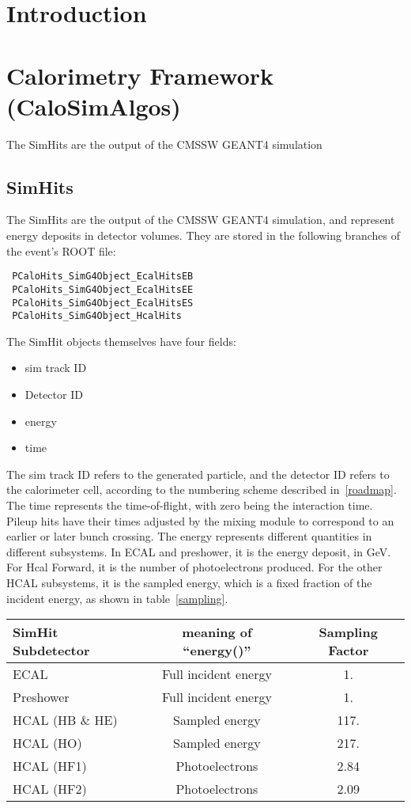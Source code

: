 \documentclass{cmspaper}
\begin{document}
\section{Introduction}


\section{Calorimetry Framework (CaloSimAlgos)}

The SimHits are the output of the CMSSW GEANT4 simulation
\subsection{SimHits}

The SimHits are the output of the CMSSW GEANT4 simulation, and represent energy deposits in
detector volumes.  They are stored in the following branches of the event's ROOT file:

\begin{verbatim}
 PCaloHits_SimG4Object_EcalHitsEB
 PCaloHits_SimG4Object_EcalHitsEE
 PCaloHits_SimG4Object_EcalHitsES
 PCaloHits_SimG4Object_HcalHits
\end{verbatim}

The SimHit objects themselves have four fields:
\begin{itemize}
\item sim track ID
\item Detector ID
\item energy
\item time
\end{itemize}

The sim track ID refers to the generated particle, and the detector ID
refers to the calorimeter cell, according to the numbering scheme
described in~\ref{roadmap}.  The time represents the time-of-flight,
with zero being the interaction time.  Pileup hits have their
times adjusted by the mixing module to correspond to an earlier or
later bunch crossing.  The energy represents different
quantities in different subsystems.  In ECAL and preshower, it is the
energy deposit, in GeV.  For Hcal Forward, it is the number of photoelectrons
produced.  For the other HCAL subsystems, it is the sampled energy,
which is a fixed fraction of the incident energy, as shown in table~\ref{sampling}.

    \begin{center}
      \begin{tabular}{|l|c|c|} \hline
       \label{sampling}
         SimHit Subdetector & meaning of ``energy()'' & Sampling Factor \\ \hline
         ECAL & Full incident energy & 1. \\ 
         Preshower & Full incident energy & 1. \\ 
         HCAL (HB \& HE) & Sampled energy & 117.\\
         HCAL (HO) & Sampled energy & 217. \\ 
         HCAL (HF1) & Photoelectrons & 2.84 \\
         HCAL (HF2) & Photoelectrons & 2.09 \\ \hline
      \end{tabular}
    \end{center}
\end{document}
